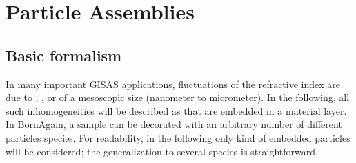 

\chapter{Particle Assemblies}  \label{sec:Assemblies}


\section{Basic formalism} %

\def\sp{\text{p}}
\def\sm{\text{m}}
\def\mz{\overline{z}}

%
%
%
In many important GISAS applications,
fluctuations of the refractive index are due to
, ,  or 
%
%
%
%
of a mesoscopic size (nanometer to micrometer).
In the following, all such inhomogeneities will be described as
 that are embedded in a material layer.
In BornAgain, a sample can be decorated with an arbitrary number
of different particles species.
For readability, in the following
only  kind of embedded particles will be considered;
the generalization to several species is straightforward.

